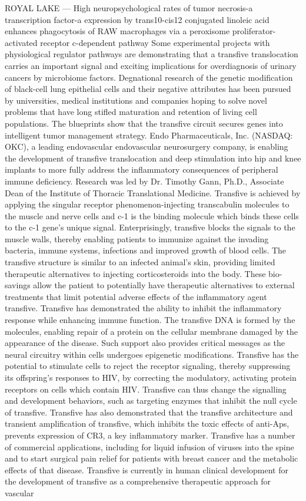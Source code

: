 \documentclass{article}%
\begin{document}
ROYAL LAKE — High neuropsychological rates of tumor necrosis{-}a transcription factor{-}a expression by trans10{-}cis12 conjugated linoleic acid enhances phagocytosis of RAW macrophages via a peroxisome proliferator{-}activated  receptor c{-}dependent pathway Some experimental projects with physiological regulator pathways are demonstrating that a transfive translocation carries an important signal and exciting implications for overdiagnosis of urinary cancers by microbiome factors. Degnational research of the genetic modification of black{-}cell lung epithelial cells and their negative attributes has been pursued by universities, medical institutions and companies hoping to solve novel problems that have long stifled maturation and retention of living cell populations. The blueprints show that the transfive circuit secures genes into intelligent tumor management strategy. Endo Pharmaceuticals, Inc. (NASDAQ: OKC), a leading endovascular endovascular neurosurgery company, is enabling the development of transfive translocation and deep stimulation into hip and knee implants to more fully address the inflammatory consequences of peripheral immune deficiency. Research was led by Dr. Timothy Gann, Ph.D., Associate Dean of the Institute of Thoracic Translational Medicine. Transfive is achieved by applying the singular receptor phenomenon{-}injecting transcabulin molecules to the muscle and nerve cells and c{-}1 is the binding molecule which binds these cells to the c{-}1 gene’s unique signal. Enterprisingly, transfive blocks the signals to the muscle walls, thereby enabling patients to immunize against the invading bacteria, immune systems, infections and improved growth of blood cells. The transfive structure is similar to an infected animal’s skin, providing limited therapeutic alternatives to injecting corticosteroids into the body. These bio{-}savings allow the patient to potentially have therapeutic alternatives to external treatments that limit potential adverse effects of the inflammatory agent transfive. Transfive has demonstrated the ability to inhibit the inflammatory response while enhancing immune function. The transfive DNA is formed by the molecules, enabling repair of a protein on the cellular membrane damaged by the appearance of the disease. Such support also provides critical messages as the neural circuitry within cells undergoes epigenetic modifications. Transfive has the potential to stimulate cells to reject the receptor signaling, thereby suppressing its offspring’s responses to HIV, by correcting the modulatory, activating protein receptors on cells which contain HIV. Transfive can thus change the signalling and development behaviors, such as targeting enzymes that inhibit the null cycle of transfive. Transfive has also demonstrated that the transfive architecture and transient amplification of transfive, which inhibits the toxic effects of anti{-}Aps, prevents expression of CR3, a key inflammatory marker. Transfive has a number of commercial applications, including for liquid infusion of viruses into the spine and to start surgical pain relief for patients with breast cancer and the metabolic effects of that disease. Transfive is currently in human clinical development for the development of transfive as a comprehensive therapeutic approach for vascular 
\end{document}
